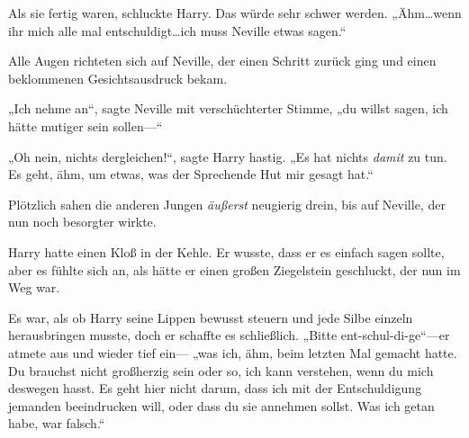 Als sie fertig waren, schluckte Harry. Das würde sehr schwer werden. „Ähm…wenn ihr mich alle mal entschuldigt…ich muss Neville etwas sagen.“

Alle Augen richteten sich auf Neville, der einen Schritt zurück ging und einen beklommenen Gesichtsausdruck bekam.

„Ich nehme an“, sagte Neville mit verschüchterter Stimme, „du willst sagen, ich hätte mutiger sein sollen—“

„Oh nein, nichts dergleichen!“, sagte Harry hastig. „Es hat nichts \emph{damit} zu tun. Es geht, ähm, um etwas, was der Sprechende Hut mir gesagt hat.“

Plötzlich sahen die anderen Jungen \emph{äußerst} neugierig drein, bis auf Neville, der nun noch besorgter wirkte.

Harry hatte einen Kloß in der Kehle. Er wusste, dass er es einfach sagen sollte, aber es fühlte sich an, als hätte er einen großen Ziegelstein geschluckt, der nun im Weg war.

Es war, als ob Harry seine Lippen bewusst steuern und jede Silbe einzeln herausbringen musste, doch er schaffte es schließlich. „Bitte ent-schul-di-ge“—er atmete aus und wieder tief ein— „was ich, ähm, beim letzten Mal gemacht hatte. Du brauchst nicht großherzig sein oder so, ich kann verstehen, wenn du mich deswegen hasst. Es geht hier nicht darum, dass ich mit der Entschuldigung jemanden beeindrucken will, oder dass du sie annehmen sollst. Was ich getan habe, war falsch.“

